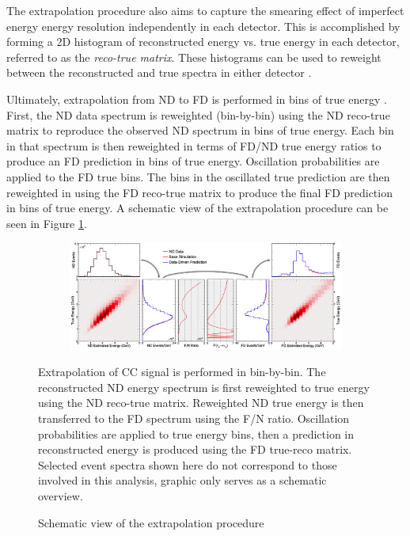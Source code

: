 The extrapolation procedure also aims to capture the smearing effect of
imperfect energy energy resolution independently in each detector.
This is accomplished by forming a 2D histogram of reconstructed energy
vs. true energy in each detector, referred to as the \textit{reco-true matrix}.
These histograms can be used to reweight between the reconstructed
and true spectra in either detector \cite{lozier2015extrap}.

Ultimately, extrapolation from ND to FD is performed in bins of true energy
\cite{lozier2015extrap}.
First, the ND data spectrum is reweighted (bin-by-bin)
using the ND reco-true matrix
to reproduce the observed ND spectrum in bins of true energy.
Each bin in that spectrum is then reweighted in terms of FD/ND true energy
ratios to
produce an FD prediction in bins of true energy.
Oscillation probabilities are applied to the FD true bins.
The bins in the
oscillated true prediction are then reweighted in using the FD reco-true
matrix to produce the final FD prediction in bins of true energy.
A schematic view of the extrapolation procedure can be seen in Figure
\ref{extrap_fig}.

\begin{figure}
\begin{center}
  \begin{subfigure}[b]{\textwidth}
    \centering
    \includegraphics[height=0.45\textwidth, angle=-90]{figures/figures/extrap_schematic.png}
  \end{subfigure}
\end{center}
\caption{Schematic view of the extrapolation procedure}{
Extrapolation of \numu CC signal is performed in bin-by-bin.
The reconstructed ND energy spectrum is first reweighted to true energy
using the ND reco-true matrix.
Reweighted ND true energy is then transferred to the FD spectrum using the
F/N ratio.
Oscillation probabilities are applied to true energy bins,
then a prediction in reconstructed energy is produced using the
FD true-reco matrix.
Selected event spectra shown here do not correspond to those
involved in this analysis, graphic only serves as a schematic overview.
}
\label{extrap_fig}
\end{figure}

